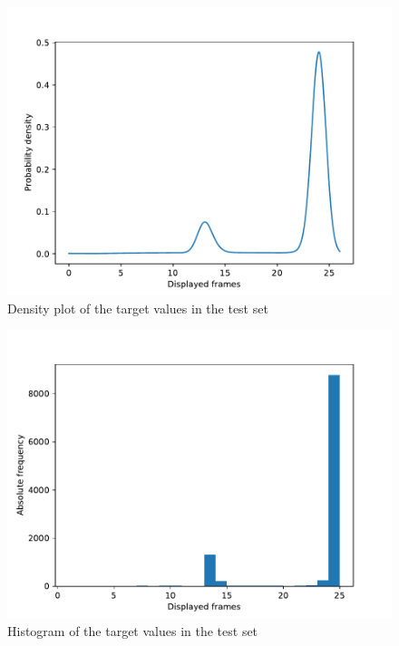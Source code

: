 \documentclass[10pt]{article}
\begin{document}
\begin{figure}
    \centering
    \includegraphics[width=\textwidth,height=0.25\textheight,keepaspectratio]{../result/project1/frames_density.pdf}
    \caption{Density plot of the target values in the test set}
    \label{fig:2}
\end{figure}

\begin{figure}
    \centering
    \includegraphics[width=\textwidth,height=0.25\textheight,keepaspectratio]{../result/project1/frames_hist.pdf}
    \caption{Histogram of the target values in the test set}
    \label{fig:3}
\end{figure}
\end{document}
